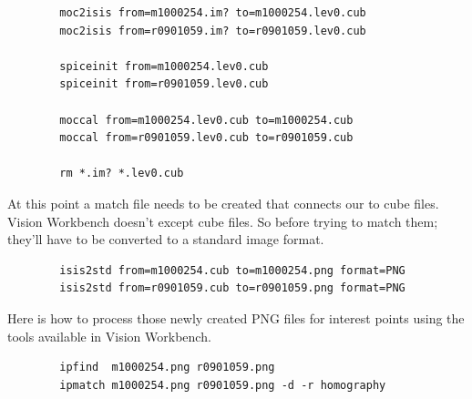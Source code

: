 \begin{verbatim}
        moc2isis from=m1000254.im? to=m1000254.lev0.cub
        moc2isis from=r0901059.im? to=r0901059.lev0.cub

        spiceinit from=m1000254.lev0.cub
        spiceinit from=r0901059.lev0.cub

        moccal from=m1000254.lev0.cub to=m1000254.cub
        moccal from=r0901059.lev0.cub to=r0901059.cub

        rm *.im? *.lev0.cub
\end{verbatim}

At this point a match file needs to be created that connects our to
cube files. Vision Workbench doesn't except cube files. So before
trying to match them; they'll have to be converted to a standard image
format.

\begin{verbatim}
        isis2std from=m1000254.cub to=m1000254.png format=PNG
        isis2std from=r0901059.cub to=r0901059.png format=PNG
\end{verbatim}

Here is how to process those newly created PNG files for interest
points using the tools available in Vision Workbench.

\begin{verbatim}
        ipfind  m1000254.png r0901059.png
        ipmatch m1000254.png r0901059.png -d -r homography
\end{verbatim}

\begin{center}
\end{center}

